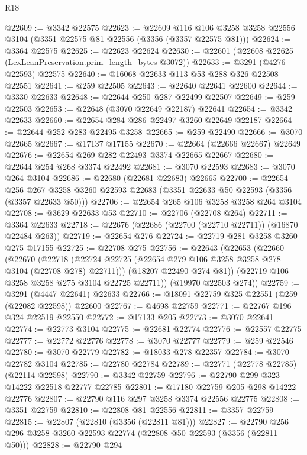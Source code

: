 \begin{lexlean}{R18}
\begin{coremodule}
@22609 := @3342 @22575
@22623 := @22609
    @116
    @106
    @3258
    @3258
    @22556
    @3104
    (@3351 @22575 @81 @22556 (@3356 (@3357 @22575 @81)))
@22624 := @3364 @22575
@22625 := @22623 @22624
@22630 := @22601 (@22608 @22625 (LexLeanPreservation.prim_length_bytes @3072))
@22633 := @3291 (@4276 @22593) @22575
@22640 := @16068 @22633 @113 @53 @288 @326 @22508 @22551
@22641 := @259 @22505
@22643 := @22640 @22641 @22600
@22644 := @3330 @22633
@22648 := @22644 @250 @287 @22499 @22507
@22649 := @259 @22503
@22653 := @22648 (@3070 @22649 @22187) @22641
@22654 := @3342 @22633
@22660 := @22654 @284 @286 @22497 @3260 @22649 @22187
@22664 := @22644 @252 @283 @22495 @3258
@22665 := @259 @22490
@22666 := @3070 @22665
@22667 := @17137 @17155
@22670 := @22664 (@22666 @22667) @22649
@22676 := @22654 @269 @282 @22493 @3374 @22665 @22667
@22680 := @22644 @254 @268 @3374 @22492
@22681 := @3070 @22593
@22683 := @3070 @264 @3104
@22686 := @22680 (@22681 @22683) @22665
@22700 := @22654
    @256
    @267
    @3258
    @3260
    @22593
    @22683
    (@3351 @22633 @50 @22593 (@3356 (@3357 @22633 @50)))
@22706 := @22654 @265 @106 @3258 @3258 @264 @3104
@22708 := @3629 @22633 @53
@22710 := @22706 (@22708 @264)
@22711 := @3364 @22633
@22718 := @22676 (@22686 (@22700 (@22710 @22711)) (@16870 @22484 @263))
@22719 := @22654 @276
@22724 := @22719 @281 @3258 @3260 @275 @17155
@22725 := @22708 @275
@22756 := @22643
    (@22653
      (@22660
        (@22670
          (@22718 (@22724 @22725 (@22654 @279 @106 @3258 @3258 @278 @3104 (@22708 @278) @22711)))
          (@18207 @22490 @274 @81))
        (@22719 @106 @3258 @3258 @275 @3104 @22725 @22711))
      (@19970 @22503 @274))
@22759 := @3291 (@4447 @22641) @22633
@22766 := @18091 @22759 @325 @22551 (@259 (@22082 @22598)) @22600
@22767 := @4698 @22759
@22771 := @22767 @196 @324 @22519 @22550
@22772 := @17133 @205
@22773 := @3070 @22641
@22774 := @22773 @3104
@22775 := @22681 @22774
@22776 := @22557 @22775
@22777 := @22772 @22776
@22778 := @3070 @22777
@22779 := @259 @22546
@22780 := @3070 @22779
@22782 := @18033 @278 @22357
@22784 := @3070 @22782 @3104
@22785 := @22780 @22784
@22789 := @22771 (@22778 @22785) (@22114 @22598)
@22790 := @3342 @22759
@22796 := @22790 @299 @323 @14222 @22518 @22777 @22785
@22801 := @17180 @22759 @205 @298 @14222 @22776
@22807 := @22790 @116 @297 @3258 @3374 @22556 @22775
@22808 := @3351 @22759
@22810 := @22808 @81 @22556
@22811 := @3357 @22759
@22815 := @22807 (@22810 (@3356 (@22811 @81)))
@22827 := @22790 @256 @296 @3258 @3260 @22593 @22774 (@22808 @50 @22593 (@3356 (@22811 @50)))
@22828 := @22790 @294

\end{coremodule}
\end{lexlean}
